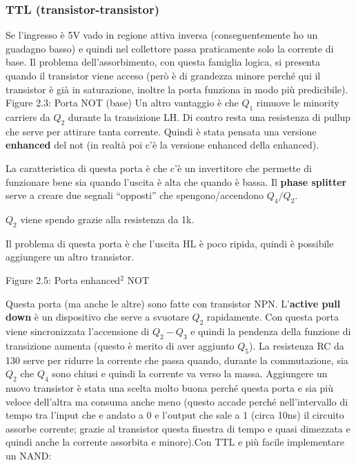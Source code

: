 \documentclass[
]{article}
\begin{document}
\subsubsection{TTL
(transistor-transistor)}\label{ttl-transistor-transistor}

Se l'ingresso è 5V vado in regione attiva inversa (conseguentemente ho
un guadagno basso) e quindi nel collettore passa praticamente solo la
corrente di base. Il problema dell'assorbimento, con questa famiglia
logica, si presenta quando il transistor viene acceso (però è di
grandezza minore perché qui il transistor è già in saturazione, inoltre
la porta funziona in modo più predicibile). Figure 2.3: Porta NOT (base)
Un altro vantaggio è che \(Q_{1}\) rimuove le minority carriers da
\(Q_{2}\) durante la transizione LH. Di contro resta una resistenza di
pullup che serve per attirare tanta corrente. \newline Quindi è stata
pensata una versione \textbf{enhanced} del not (in realtà poi c'è la
versione enhanced della enhanced).

La caratteristica di questa porta è che c'è un invertitore che permette
di funzionare bene sia quando l'uscita è alta che quando è bassa. Il
\textbf{phase splitter} serve a creare due segnali ``opposti'' che
spengono/accendono \(Q_{4}/Q_{2}\).

\(Q_{2}\) viene spendo grazie alla resistenza da 1k.

Il problema di questa porta è che l'uscita HL è poco ripida, quindi è
possibile aggiungere un altro transistor.

Figure 2.5: Porta enhanced\({}^{2}\) NOT

Questa porta (ma anche le altre) sono fatte con transistor NPN.
L'\textbf{active pull down} è un dispositivo che serve a svuotare
\(Q_{2}\) rapidamente. Con questa porta viene sincronizzata l'accensione
di \(Q_{2}-Q_{3}\) e quindi la pendenza della funzione di transizione
aumenta (questo è merito di aver aggiunto \(Q_{5}\)). La resistenza RC
da 130 serve per ridurre la corrente che passa quando, durante la
commutazione, sia \(Q_{2}\) che \(Q_{4}\) sono chiusi e quindi la
corrente va verso la massa. Aggiungere un nuovo transistor è stata una
scelta molto buona perché questa porta e sia più veloce dell'altra ma
consuma anche meno (questo accade perché nell'intervallo di tempo tra
l'input che e andato a 0 e l'output che sale a 1 (circa 10ns) il
circuito assorbe corrente; grazie al transistor questa finestra di tempo
e quasi dimezzata e quindi anche la corrente assorbita e
minore).\newline Con TTL e più facile implementare un NAND:
\end{document}
